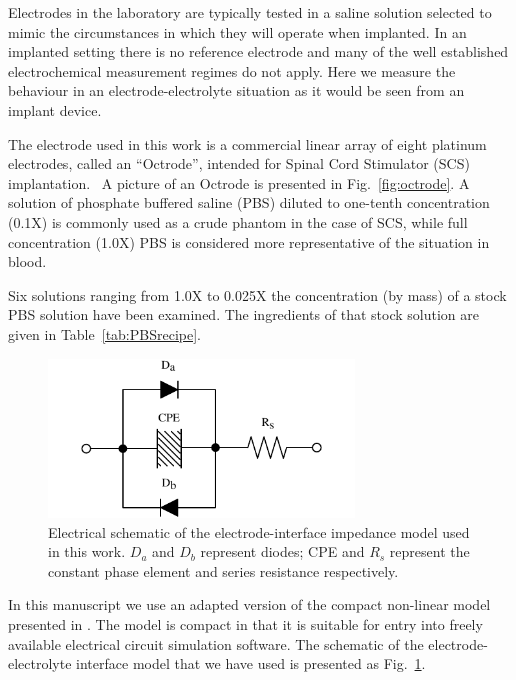\documentclass[journal, a4paper]{IEEEtran}
\begin{document}
Electrodes in the laboratory are typically tested in a saline solution selected to mimic the circumstances in which they will operate when implanted. In an implanted setting there is no reference electrode and many of the well established electrochemical measurement regimes do not apply. Here we measure the behaviour in an electrode-electrolyte situation as it would be seen from an implant device.

The electrode used in this work is a commercial linear array of eight platinum electrodes, called an ``Octrode'', intended for Spinal Cord Stimulator (SCS) implantation.~\cite{StJudeOctrode} A picture of an Octrode is presented in Fig.~\ref{fig:octrode}. A solution of phosphate buffered saline (PBS) diluted to one-tenth concentration (0.1X) is commonly {\color{blue}used as a crude phantom} in the case of SCS, while full concentration (1.0X) PBS is considered more representative of the situation in blood.

Six solutions ranging from 1.0X to 0.025X the concentration (by mass) of a stock PBS solution have been examined.
The ingredients of that stock solution are given in Table~\ref{tab:PBSrecipe}.

{
    \color{blue}

    \begin{figure}
        \begin{center}
            \includegraphics[width=230pt]{graphics/interfaceSchematic_noMemristive}
        \end{center}
        \caption{Electrical schematic of the electrode-interface impedance model used in this work. $D_{a}$ and $D_{b}$ represent diodes; CPE and $R_{s}$ represent the constant phase element and series resistance respectively.}
        \label{fig:schematic}
    \end{figure}

    In this manuscript we use an adapted version of the compact non-linear model presented in \cite{ScottSingle2013}. The model is compact in that it is suitable for {\color{blue} entry into freely available electrical circuit simulation software}. The schematic of the {\color{blue} electrode-electrolyte interface} model that we have used is presented as Fig.~\ref{fig:schematic}.
}
\end{document}
